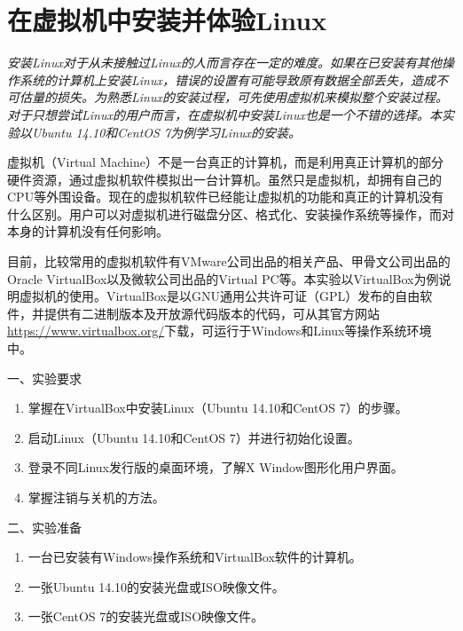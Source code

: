\chapter{在虚拟机中安装并体验Linux}

{\itshape
安装Linux对于从未接触过Linux的人而言存在一定的难度。如果在已安装有其他操作系统的计算机上安装Linux，错误的设置有可能导致原有数据全部丢失，造成不可估量的损失。为熟悉Linux的安装过程，可先使用虚拟机来模拟整个安装过程。对于只想尝试Linux的用户而言，在虚拟机中安装Linux也是一个不错的选择。本实验以Ubuntu 14.10和CentOS 7为例学习Linux的安装。

虚拟机（Virtual Machine）不是一台真正的计算机，而是利用真正计算机的部分硬件资源，通过虚拟机软件模拟出一台计算机。虽然只是虚拟机，却拥有自己的CPU等外围设备。现在的虚拟机软件已经能让虚拟机的功能和真正的计算机没有什么区别。用户可以对虚拟机进行磁盘分区、格式化、安装操作系统等操作，而对本身的计算机没有任何影响。

目前，比较常用的虚拟机软件有VMware公司出品的相关产品、甲骨文公司出品的Oracle VirtualBox以及微软公司出品的Virtual PC等。本实验以VirtualBox为例说明虚拟机的使用。VirtualBox是以GNU通用公共许可证（GPL）发布的自由软件，并提供有二进制版本及开放源代码版本的代码，可从其官方网站\href{https://www.virtualbox.org/}{https://www.virtualbox.org/}下载，可运行于Windows和Linux等操作系统环境中。
}

\vspace{0.2in}
\noindent
一、实验要求
\begin{enumerate}
  \item 掌握在VirtualBox中安装Linux（Ubuntu 14.10和CentOS 7）的步骤。
  \item 启动Linux（Ubuntu 14.10和CentOS 7）并进行初始化设置。
  \item 登录不同Linux发行版的桌面环境，了解X Window图形化用户界面。
  \item 掌握注销与关机的方法。
\end{enumerate}

\vspace{0.2in}
\noindent
二、实验准备
\begin{enumerate}
  \item 一台已安装有Windows操作系统和VirtualBox软件的计算机。
  \item 一张Ubuntu 14.10的安装光盘或ISO映像文件。
  \item 一张CentOS 7的安装光盘或ISO映像文件。
\end{enumerate}

